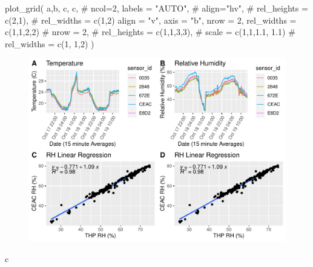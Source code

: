 \documentclass[
  letterpaper,
  DIV=11,
  numbers=noendperiod]{scrartcl}
\newenvironment{Shaded}{\begin{snugshade}}{\end{snugshade}}
\newcommand{\AttributeTok}[1]{\textcolor[rgb]{0.40,0.45,0.13}{#1}}
\newcommand{\CommentTok}[1]{\textcolor[rgb]{0.37,0.37,0.37}{#1}}
\newcommand{\DecValTok}[1]{\textcolor[rgb]{0.68,0.00,0.00}{#1}}
\newcommand{\FunctionTok}[1]{\textcolor[rgb]{0.28,0.35,0.67}{#1}}
\newcommand{\NormalTok}[1]{\textcolor[rgb]{0.00,0.23,0.31}{#1}}
\newcommand{\StringTok}[1]{\textcolor[rgb]{0.13,0.47,0.30}{#1}}
\begin{document}
\begin{Shaded}
\begin{Highlighting}[]
\FunctionTok{plot\_grid}\NormalTok{(}
\NormalTok{  a,b, c, c,}
  \CommentTok{\# ncol=2,}
  \AttributeTok{labels =} \StringTok{"AUTO"}\NormalTok{,}
  \CommentTok{\# align="hv",}
  \CommentTok{\# rel\_heights = c(2,1),}
  \CommentTok{\# rel\_widths = c(1,2)}
  \AttributeTok{align =} \StringTok{"v"}\NormalTok{, }\AttributeTok{axis =} \StringTok{"b"}\NormalTok{, }\AttributeTok{nrow =} \DecValTok{2}\NormalTok{, }\AttributeTok{rel\_widths =} \FunctionTok{c}\NormalTok{(}\DecValTok{1}\NormalTok{,}\DecValTok{1}\NormalTok{,}\DecValTok{2}\NormalTok{,}\DecValTok{2}\NormalTok{)}
  \CommentTok{\# nrow = 2,}
  \CommentTok{\# rel\_heights = c(1,1,3,3),}
  \CommentTok{\# scale = c(1,1,1.1, 1.1)}
  \CommentTok{\# rel\_widths = c(1, 1,2)}
\NormalTok{  )}
\end{Highlighting}
\end{Shaded}

\begin{figure}[H]

{\centering \includegraphics{THP_CEAC_20231102_files/figure-pdf/data_plot_stat_rh-4.pdf}

}

\end{figure}

\begin{Shaded}
\begin{Highlighting}[]
\NormalTok{c}
\end{Highlighting}
\end{Shaded}
\end{document}
